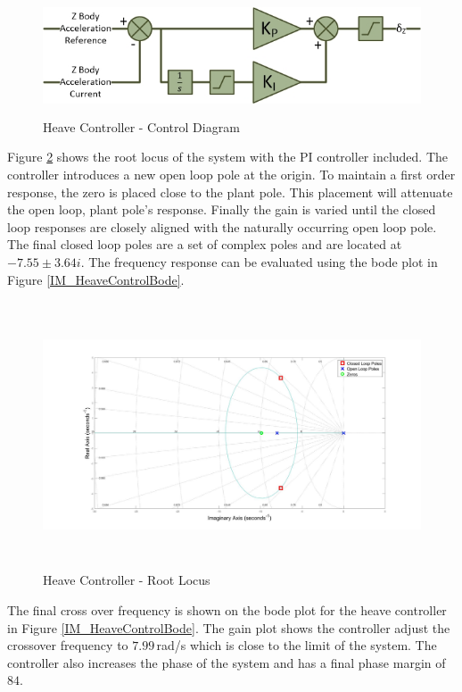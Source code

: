 	 \begin{figure}[H]
	 	\centering
	 	\includegraphics[height = 3.5cm]{../References/Diagrams/HeaveController.jpg}
	 	\caption{Heave Controller -  Control Diagram}
	 	\label{IM_HeaveController}
	 \end{figure}
	 
	 Figure \ref{IM_HeaveControlRoot} shows the root locus of the system with the PI controller included. The controller introduces a new open loop pole at the origin. To maintain a first order response, the zero is placed close to the plant pole. This placement will attenuate the open loop, plant pole's response. Finally the gain is varied until the closed loop responses are closely aligned with the naturally occurring open loop pole. The final closed loop poles are a set of complex poles and are located at $-7.55 \pm 3.64 i$. The frequency response can be evaluated using the bode plot in Figure \ref{IM_HeaveControlBode}. 
	 
	 \begin{figure}[H]
	 	\centering
	 	\includegraphics[height = 7.9cm]{../Design/Matlab/Controllers/heave_root.jpg}
	 	\caption{Heave Controller -  Root Locus}
	 	\label{IM_HeaveControlRoot}
	 \end{figure}
	 
	 The final cross over frequency is shown on the bode plot for the heave controller in Figure \ref{IM_HeaveControlBode}. The gain plot shows the controller adjust the crossover frequency to $7.99$\,rad/s which is close to the limit of the system. The controller also increases the phase of the system and has a final phase margin of $84$\textdegree.
	 
